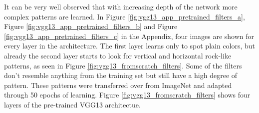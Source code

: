\begin{figure}[!h]
\label{fig:vgg13_pretrained_filters}
\end{figure}

\quad

It can be very well observed that with increasing depth of the network more complex patterns are learned. In Figure \ref{fig:vgg13_app_pretrained_filters_a}, Figure \ref{fig:vgg13_app_pretrained_filters_b} and Figure \ref{fig:vgg13_app_pretrained_filters_c} in the Appendix, four images are shown for every layer in the architecture. The first layer learns only to spot plain colors, but already the second layer starts to look for vertical and horizontal rock-like patterns, as seen in Figure \ref{fig:vgg13_fromscratch_filters}. Some of the filters don't resemble anything from the training set but still have a high degree of pattern. These patterns were transferred over from ImageNet and adapted through 50 epochs of learning. Figure \ref{fig:vgg13_fromscratch_filters} shows four layers of the pre-trained VGG13 architectue. \\


